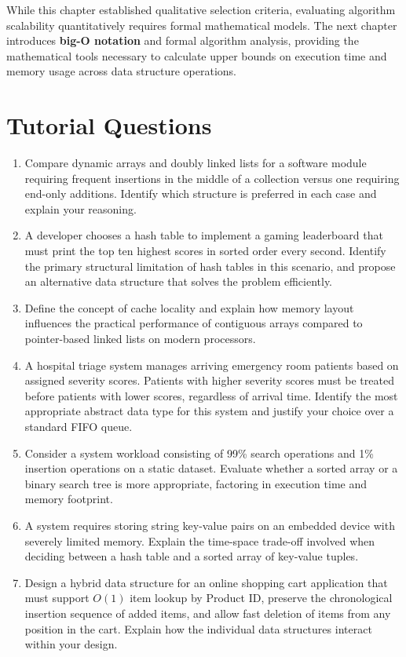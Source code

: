\documentclass[12pt]{report}
\begin{document}
While this chapter established qualitative selection criteria, evaluating algorithm scalability quantitatively requires formal mathematical models. The next chapter introduces \textbf{big-O notation} and formal algorithm analysis, providing the mathematical tools necessary to calculate upper bounds on execution time and memory usage across data structure operations.

\section*{Tutorial Questions}

\begin{enumerate}
    \item Compare dynamic arrays and doubly linked lists for a software module requiring frequent insertions in the middle of a collection versus one requiring end-only additions. Identify which structure is preferred in each case and explain your reasoning.
    \item A developer chooses a hash table to implement a gaming leaderboard that must print the top ten highest scores in sorted order every second. Identify the primary structural limitation of hash tables in this scenario, and propose an alternative data structure that solves the problem efficiently.
    \item Define the concept of cache locality and explain how memory layout influences the practical performance of contiguous arrays compared to pointer-based linked lists on modern processors.
    \item A hospital triage system manages arriving emergency room patients based on assigned severity scores. Patients with higher severity scores must be treated before patients with lower scores, regardless of arrival time. Identify the most appropriate abstract data type for this system and justify your choice over a standard FIFO queue.
    \item Consider a system workload consisting of 99\% search operations and 1\% insertion operations on a static dataset. Evaluate whether a sorted array or a binary search tree is more appropriate, factoring in execution time and memory footprint.
    \item A system requires storing string key-value pairs on an embedded device with severely limited memory. Explain the time-space trade-off involved when deciding between a hash table and a sorted array of key-value tuples.
    \item Design a hybrid data structure for an online shopping cart application that must support $O(1)$ item lookup by Product ID, preserve the chronological insertion sequence of added items, and allow fast deletion of items from any position in the cart. Explain how the individual data structures interact within your design.
\end{enumerate}
\end{document}
